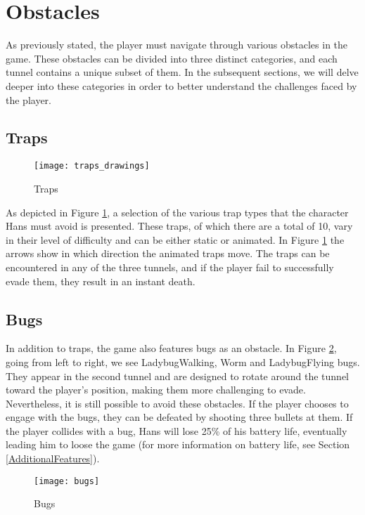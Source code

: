 \section{Obstacles}
As previously stated, the player must navigate through various obstacles in the game. These obstacles can be divided into three distinct categories, and each tunnel contains a unique subset of them. In the subsequent sections, we will delve deeper into these categories in order to better understand the challenges faced by the player.

\subsection{Traps}
\begin{figure}[h]
    \centering
    \texttt{[image: traps\_drawings]}
    \caption{Traps}
    \label{fig:traps}
\end{figure}
As depicted in Figure \ref{fig:traps}, a selection of the various trap types that the character Hans must avoid is presented. These traps, of which there are a total of 10, vary in their level of difficulty and can be either static or animated. In Figure \ref{fig:traps} the arrows show in which direction the animated traps move. The traps can be encountered in any of the three tunnels, and if the player fail to successfully evade them, they result in an instant death.

\subsection{Bugs}
\label{Bugs}
In addition to traps, the game also features bugs as an obstacle. In Figure \ref{fig:bugs}, going from left to right, we see LadybugWalking, Worm and  LadybugFlying bugs. They appear in the second tunnel and are designed to rotate around the tunnel toward the player's position, making them more challenging to evade. Nevertheless, it is still possible to avoid these obstacles. If the player chooses to engage with the bugs, they can be defeated by shooting three bullets at them. If the player collides with a bug, Hans will lose 25\% of his battery life, eventually leading him to loose the game (for more information on battery life, see Section \ref{AdditionalFeatures}).
\begin{figure}[h]
    \centering
    \texttt{[image: bugs]}
    \caption{Bugs}
    \label{fig:bugs}
\end{figure}

